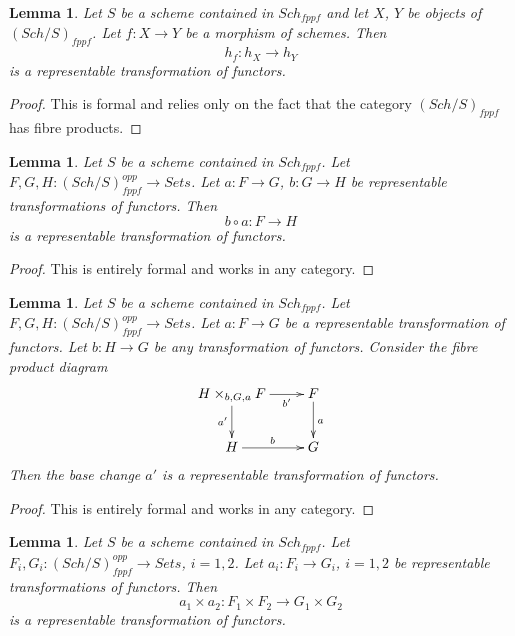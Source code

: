 \documentclass{stacks-project}
\theoremstyle{plain}
\newtheorem{lemma}[subsection]{Lemma}
\theoremstyle{definition}
\theoremstyle{remark}
\numberwithin{equation}{subsection}
\def\Sch{\mathit{Sch}}
\begin{document}
\begin{lemma}
\label{lemma-morphism-schemes-gives-representable-transformation}
Let $S$ be a scheme contained in $\Sch_{fppf}$ and let
$X$, $Y$ be objects of $(\Sch/S)_{fppf}$.
Let $f : X \to Y$ be a morphism of schemes.
Then
$$
h_f : h_X \longrightarrow h_Y
$$
is a representable transformation of functors.
\end{lemma}

\begin{proof}
This is formal and relies only on the fact that
the category $(\Sch/S)_{fppf}$ has fibre products.
\end{proof}

\begin{lemma}
\label{lemma-composition-representable-transformations}
Let $S$ be a scheme contained in $\Sch_{fppf}$.
Let $F, G, H : (\Sch/S)_{fppf}^{opp} \to \textit{Sets}$.
Let $a : F \to G$, $b : G \to H$ be representable transformations of functors.
Then
$$
b \circ a : F \longrightarrow H
$$
is a representable transformation of functors.
\end{lemma}

\begin{proof}
This is entirely formal and works in any category.
\end{proof}

\begin{lemma}
\label{lemma-base-change-representable-transformations}
Let $S$ be a scheme contained in $\Sch_{fppf}$.
Let $F, G, H : (\Sch/S)_{fppf}^{opp} \to \textit{Sets}$.
Let $a : F \to G$ be a representable transformation of functors.
Let $b : H \to G$ be any transformation of functors.
Consider the fibre product diagram
$$
\xymatrix{
H \times_{b, G, a} F \ar[r]_-{b'} \ar[d]_{a'} & F \ar[d]^a \\
H \ar[r]^b & G
}
$$
Then the base change $a'$ is a representable transformation of functors.
\end{lemma}

\begin{proof}
This is entirely formal and works in any category.
\end{proof}

\begin{lemma}
\label{lemma-product-representable-transformations}
Let $S$ be a scheme contained in $\Sch_{fppf}$.
Let $F_i, G_i : (\Sch/S)_{fppf}^{opp} \to \textit{Sets}$, $i = 1, 2$.
Let $a_i : F_i \to G_i$, $i = 1, 2$
be representable transformations of functors.
Then
$$
a_1 \times a_2 : F_1 \times F_2 \longrightarrow G_1 \times G_2
$$
is a representable transformation of functors.
\end{lemma}
\end{document}
